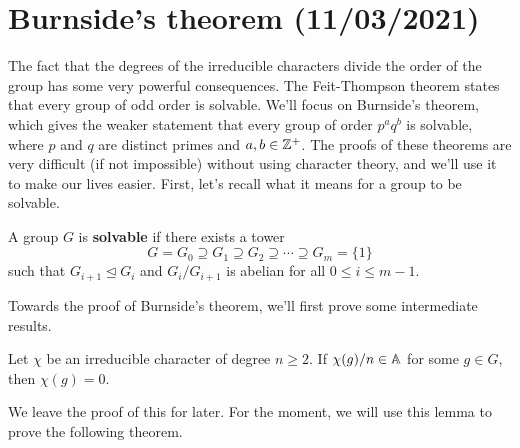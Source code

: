 \section{Burnside's theorem (11/03/2021)} 
The fact that the degrees of the irreducible characters divide the order of 
the group has some very powerful consequences. The Feit-Thompson theorem 
states that every group of odd order is solvable. We'll focus on Burnside's 
theorem, which gives the weaker statement that every group of order 
$p^a q^b$ is solvable, where $p$ and $q$ are distinct primes and $a, b \in \mathbb{Z}^+$. 
The proofs of these theorems are very difficult (if not impossible) without 
using character theory, and we'll use it to make our lives easier. 
First, let's recall what it means for a group to be solvable. 

\begin{defn}{}
    A group $G$ is {\bf solvable} if there exists a tower 
    \[ G = G_0 \supseteq G_1 \supseteq G_2 \supseteq \cdots \supseteq G_m = \{1\} \] 
    such that $G_{i+1} \trianglelefteq G_i$ and $G_i/G_{i+1}$ is abelian for 
    all $0 \leq i \leq m-1$. 
\end{defn}

Towards the proof of Burnside's theorem, we'll first prove some intermediate results. 

\begin{lemma}{}
    Let $\chi$ be an irreducible character of degree $n \geq 2$. If $\chi(g)/n 
    \in \mathbb{A}$ for some $g \in G$, then $\chi(g) = 0$. 
\end{lemma}

We leave the proof of this for later. For the moment, we 
will use this lemma to prove the following theorem. 

